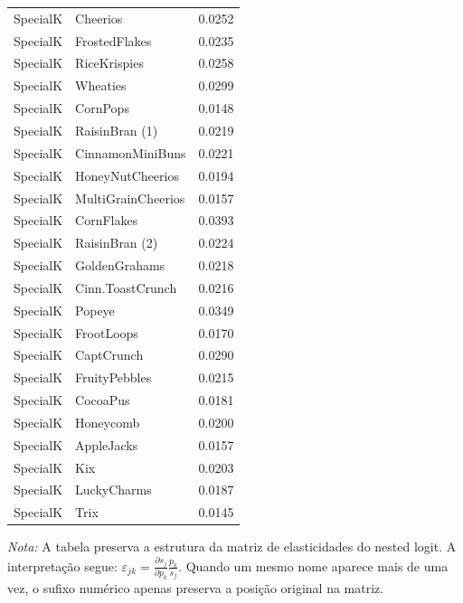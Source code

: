 \begin{table}[H]
\begin{tabular}{llr}
SpecialK & Cheerios & 0.0252 \\
SpecialK & FrostedFlakes & 0.0235 \\
SpecialK & RiceKrispies & 0.0258 \\
SpecialK & Wheaties & 0.0299 \\
SpecialK & CornPops & 0.0148 \\
SpecialK & RaisinBran (1) & 0.0219 \\
SpecialK & CinnamonMiniBuns & 0.0221 \\
SpecialK & HoneyNutCheerios & 0.0194 \\
SpecialK & MultiGrainCheerios & 0.0157 \\
SpecialK & CornFlakes & 0.0393 \\
SpecialK & RaisinBran (2) & 0.0224 \\
SpecialK & GoldenGrahams & 0.0218 \\
SpecialK & Cinn.ToastCrunch & 0.0216 \\
SpecialK & Popeye & 0.0349 \\
SpecialK & FrootLoops & 0.0170 \\
SpecialK & CaptCrunch & 0.0290 \\
SpecialK & FruityPebbles & 0.0215 \\
SpecialK & CocoaPus & 0.0181 \\
SpecialK & Honeycomb & 0.0200 \\
SpecialK & AppleJacks & 0.0157 \\
SpecialK & Kix & 0.0203 \\
SpecialK & LuckyCharms & 0.0187 \\
SpecialK & Trix & 0.0145 \\
\bottomrule
\end{tabular}

\vspace{0.3em}
\footnotesize
\textit{Nota:} A tabela preserva a estrutura da matriz de elasticidades do nested logit. A interpretação segue: $\varepsilon_{jk}=\frac{\partial s_j}{\partial p_k}\frac{p_k}{s_j}$. Quando um mesmo nome aparece mais de uma vez, o sufixo numérico apenas preserva a posição original na matriz.
\end{table}
\endgroup


